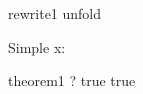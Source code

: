 \begin{zsection}
\SECTION rewrite1 \parents unfold
\end{zsection}

\begin{schema}{Simple}
  x: \nat
\end{schema}

\begin{theorem}{theorem1}
  \vdash? true \iff true
\end{theorem}

